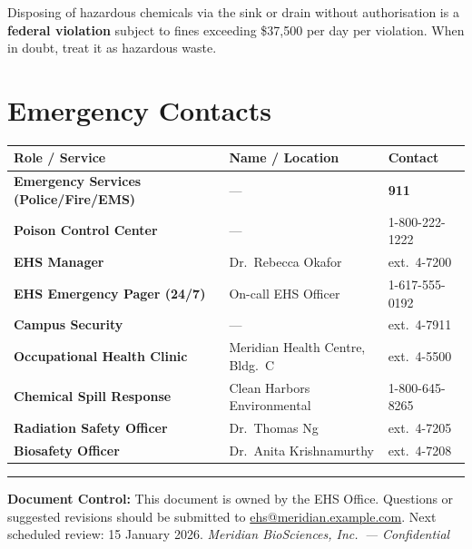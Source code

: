 \documentclass[11pt,a4paper]{article}
\newcommand{\accentrule}{%
  \noindent\color{accent}\rule{\linewidth}{2pt}\par}
\begin{document}
\begin{warnbox}[title={\faExclamationTriangle\enskip WARNING --- Drain Disposal}]
  Disposing of hazardous chemicals via the sink or drain without authorisation is a
  \textbf{federal violation} subject to fines exceeding \$37{,}500 per day per violation.
  When in doubt, treat it as hazardous waste.
\end{warnbox}

\section{Emergency Contacts}

\begin{tabularx}{\linewidth}{@{}>{\bfseries\color{accent}}l >{\raggedright\arraybackslash}X l@{}}
  \rowcolor{accent}
  \color{white}Role / Service & \color{white}Name / Location & \color{white}Contact \\
  \midrule
  Emergency Services (Police/Fire/EMS) & ---                                 & \textbf{911} \\
  Poison Control Center                & ---                                 & 1-800-222-1222 \\
  EHS Manager                          & Dr.\ Rebecca Okafor                 & ext.\ 4-7200 \\
  EHS Emergency Pager (24/7)           & On-call EHS Officer                 & 1-617-555-0192 \\
  Campus Security                      & ---                                 & ext.\ 4-7911 \\
  Occupational Health Clinic           & Meridian Health Centre, Bldg.\ C   & ext.\ 4-5500 \\
  Chemical Spill Response              & Clean Harbors Environmental         & 1-800-645-8265 \\
  Radiation Safety Officer             & Dr.\ Thomas Ng                      & ext.\ 4-7205 \\
  Biosafety Officer                    & Dr.\ Anita Krishnamurthy            & ext.\ 4-7208 \\
\end{tabularx}

\vspace{10pt}
\accentrule
\vspace{4pt}
{\small\color{neutralmid}%
  \textbf{Document Control:} This document is owned by the EHS Office. Questions or suggested
  revisions should be submitted to \href{mailto:ehs@meridian.example.com}{ehs@meridian.example.com}.
  Next scheduled review: 15 January 2026.
  \hfill \textit{Meridian BioSciences, Inc.\ --- Confidential}}
\end{document}
